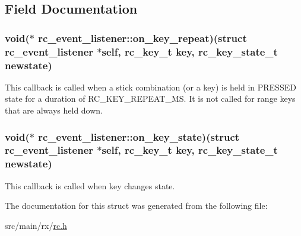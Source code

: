 \subsection{Field Documentation}
\hypertarget{structrc__event__listener_aaa9b375dd7f5d56f981e351c5e657876}{
\subsubsection[{on\+\_\+key\+\_\+repeat}]{\setlength{\rightskip}{0pt plus 5cm}void($\ast$ rc\+\_\+event\+\_\+listener\+::on\+\_\+key\+\_\+repeat)(struct {\bf rc\+\_\+event\+\_\+listener} $\ast$self, {\bf rc\+\_\+key\+\_\+t} key, {\bf rc\+\_\+key\+\_\+state\+\_\+t} newstate)}}\label{structrc__event__listener_aaa9b375dd7f5d56f981e351c5e657876}
This callback is called when a stick combination (or a key) is held in P\+R\+E\+S\+S\+E\+D state for a duration of R\+C\+\_\+\+K\+E\+Y\+\_\+\+R\+E\+P\+E\+A\+T\+\_\+\+M\+S. It is not called for range keys that are always held down. \hypertarget{structrc__event__listener_a636281a638798459ca151e7087c9ab46}{
\subsubsection[{on\+\_\+key\+\_\+state}]{\setlength{\rightskip}{0pt plus 5cm}void($\ast$ rc\+\_\+event\+\_\+listener\+::on\+\_\+key\+\_\+state)(struct {\bf rc\+\_\+event\+\_\+listener} $\ast$self, {\bf rc\+\_\+key\+\_\+t} key, {\bf rc\+\_\+key\+\_\+state\+\_\+t} newstate)}}\label{structrc__event__listener_a636281a638798459ca151e7087c9ab46}
This callback is called when key changes state. 

The documentation for this struct was generated from the following file\+:\begin{DoxyCompactItemize}
\item 
src/main/rx/\hyperlink{rc_8h}{rc.\+h}\end{DoxyCompactItemize}
